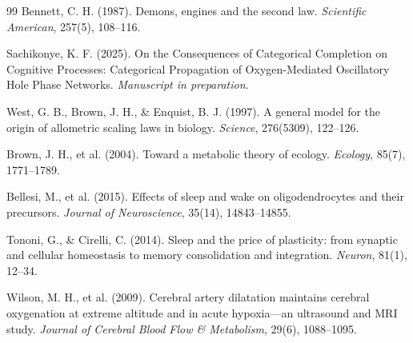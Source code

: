 \documentclass[12pt]{article}
\theoremstyle{remark}
\begin{document}
\begin{thebibliography}{99}
Bennett, C. H. (1987). Demons, engines and the second law. \textit{Scientific American}, 257(5), 108--116.

Sachikonye, K. F. (2025). On the Consequences of Categorical Completion on Cognitive Processes: Categorical Propagation of  Oxygen-Mediated Oscillatory Hole Phase Networks. \textit{Manuscript in preparation}.

West, G. B., Brown, J. H., \& Enquist, B. J. (1997). A general model for the origin of allometric scaling laws in biology. \textit{Science}, 276(5309), 122--126.

Brown, J. H., et al. (2004). Toward a metabolic theory of ecology. \textit{Ecology}, 85(7), 1771--1789.

Bellesi, M., et al. (2015). Effects of sleep and wake on oligodendrocytes and their precursors. \textit{Journal of Neuroscience}, 35(14), 14843--14855.

Tononi, G., \& Cirelli, C. (2014). Sleep and the price of plasticity: from synaptic and cellular homeostasis to memory consolidation and integration. \textit{Neuron}, 81(1), 12--34.

Wilson, M. H., et al. (2009). Cerebral artery dilatation maintains cerebral oxygenation at extreme altitude and in acute hypoxia—an ultrasound and MRI study. \textit{Journal of Cerebral Blood Flow \& Metabolism}, 29(6), 1088--1095.

\end{thebibliography}
\end{document}
